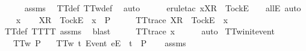 \begin{isabellebody}
\ \ \ \ \isamarkupfalse%
\ assms{\isacharparenleft}{}{\isacharparenright}\ \isamarkupfalse%
\ TT{\isacharunderscore}def\ TT{}w{\isacharunderscore}def\ \isamarkupfalse%
\ auto\isanewline
\ \ \ \ \isamarkupfalse%
\ {\isacharparenleft}erule{\isacharunderscore}tac\ x{\isacharequal}{\isachardoublequoteopen}{\isacharbrackleft}X{\isacharbrackright}\isactrlsub R\ {\isacharhash}\ {\isacharbrackleft}Tock{\isacharbrackright}\isactrlsub E\ {\isacharhash}\ {\isasymrho}{\isachardoublequoteclose}\ \ allE{\isacharcomma}\ auto{\isacharparenright}\isanewline
{}\isamarkupfalse%
\isanewline
\ \ \isamarkupfalse%
\ x\isanewline
\ \ \isamarkupfalse%
\ {\isachardoublequoteopen}{\isacharbrackleft}X{\isacharbrackright}\isactrlsub R\ {\isacharhash}\ {\isacharbrackleft}Tock{\isacharbrackright}\isactrlsub E\ {\isacharhash}\ x\ {\isasymin}\ P{\isachardoublequoteclose}\isanewline
\ \ \isamarkupfalse%
\ \isamarkupfalse%
\ {\isachardoublequoteopen}TT{}{\isacharunderscore}trace\ {\isacharparenleft}{\isacharbrackleft}X{\isacharbrackright}\isactrlsub R\ {\isacharhash}\ {\isacharbrackleft}Tock{\isacharbrackright}\isactrlsub E\ {\isacharhash}\ x{\isacharparenright}{\isachardoublequoteclose}\isanewline
\ \ \ \ \isamarkupfalse%
\ TT{}{\isacharunderscore}def\ TT{\isacharunderscore}TT{}\ assms{\isacharparenleft}{}{\isacharparenright}\ \isamarkupfalse%
\ blast\isanewline
\ \ \isamarkupfalse%
\ \isamarkupfalse%
\ {\isachardoublequoteopen}TT{}{\isacharunderscore}trace\ x{\isachardoublequoteclose}\isanewline
\ \ \ \ \isamarkupfalse%
\ auto\isanewline
{}\isamarkupfalse%
%
\endisatagproof
{\isafoldproof}%
%
\isadelimproof
\isanewline
%
\endisadelimproof
\isanewline
{}\isamarkupfalse%
\ TT{}w{\isacharunderscore}init{\isacharunderscore}event{\isacharcolon}\isanewline
\ \ \ {\isachardoublequoteopen}TT{}w\ P{\isachardoublequoteclose}\isanewline
\ \ \ {\isachardoublequoteopen}TT{}w\ {\isacharbraceleft}t{\isachardot}\ {\isacharbrackleft}Event\ e{\isacharbrackright}\isactrlsub E\ {\isacharhash}\ t\ {\isasymin}\ P{\isacharbraceright}{\isachardoublequoteclose}\isanewline
%
\isadelimproof
\ \ %
\endisadelimproof
%
\isatagproof
{}\isamarkupfalse%
\ assms\ \isamarkupfalse%

\end{isabellebody}
